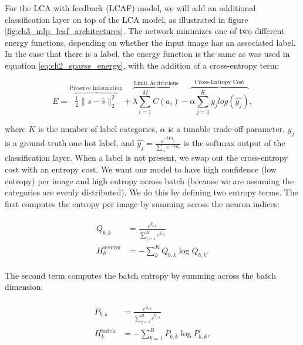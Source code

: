 For the LCA with feedback (LCAF) model, we will add an additional classification layer on top of the LCA model, as illustrated in figure \ref{fig:ch3_mlp_lcaf_architectures}. The network minimizes one of two different energy functions, depending on whether the input image has an associated label. In the case that there is a label, the energy function is the same as was used in equation \eqref{eq:ch2_sparse_energy}, with the addition of a cross-entropy term:

\begin{equation}\label{eq:ch3_lcaf_supervised_energy}
         E =
        \overbrace{ \tfrac{1}{2} \| s - \hat{s} \|_{2}^{2} }^\text{Preserve Information} +
        \overbrace{ \lambda \sum\limits_{i=1}^{M}C(a_{i}) }^\text{Limit Activations} -
        \overbrace{ \alpha \sum\limits_{j=1}^{K} y_{j}log(\hat{y_{j}})}^\text{Cross-Entropy Cost},
\end{equation}

\noindent where $K$ is the number of label categories, $\alpha$ is a tunable trade-off parameter, $y_{j}$ is a ground-truth one-hot label, and $\hat{y_{j}} = \frac{e^{-Wa_{j}}}{\sum_{n}e^{-Wa_{n}}}$ is the softmax output of the classification layer. When a label is not present, we swap out the cross-entropy cost with an entropy cost. We want our model to have high confidence (low entropy) per image and high entropy across batch (because we are assuming the categories are evenly distributed). We do this by defining two entropy terms. The first computes the entropy per image by summing across the neuron indices:

\begin{align}\label{eq:ch3_lcaf_q_dist}
\begin{split}
  Q_{b,k} &= \frac{e^{\hat{y}_{b,k}}}{\sum\limits_{j=1}^{K}e^{\hat{y}_{b,j}}} \\
  H^{\text{neuron}}_{b} &= -\sum\limits_{k}^{K}Q_{b,k}\log Q_{b,k}.
 \end{split}
\end{align}

The second term computes the batch entropy by summing across the batch dimension:

\begin{align}\label{eq:ch3_lcaf_p_dist}
\begin{split}
  P_{b,k} &= \frac{e^{\hat{y}_{b,k}}}{\sum\limits_{j=1}^{B} e^{\hat{y}_{j,k}}} \\
  H^{\text{batch}}_{k} &= -\sum\limits_{b=1}^{B}P_{b,k}\log P_{b,k},
 \end{split}
\end{align}

